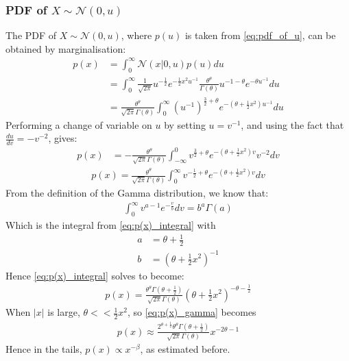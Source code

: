 \documentclass[a4paper]{article}
\begin{document}
\subsubsection{PDF of $X \sim \mathcal{N}(0, u)$}
The PDF of $X \sim \mathcal{N}(0, u)$, where $p(u)$ is taken from \autoref{eq:pdf_of_u}, can be obtained by
marginalisation:
\begin{align*}
    p(x) &= \int_0^\infty \mathcal{N}(x | 0, u) p(u) du \\
    &= \int_0^\infty \frac{1}{\sqrt{2\pi}} u^{-\frac{1}{2}} e^{-\frac{1}{2} x^2 u^{-1}}
    \frac{\theta^{\theta}}{\Gamma(\theta)} u^{-1-\theta} e^{-\theta u^{-1}} du \\
    &= \frac{\theta^{\theta}}{\sqrt{2\pi} \Gamma(\theta)}
    \int_0^\infty \left( u^{-1} \right) ^ {\frac{3}{2} + \theta} e^{-\left( \theta + \frac{1}{2} x^2 \right) u^{-1}} du
\end{align*}
Performing a change of variable on $u$ by setting $u = v^{-1}$, and using the fact that $\frac{du}{dv} = -v^{-2}$,
gives:
\begin{align*}
    p(x) &= - \frac{\theta^{\theta}}{\sqrt{2\pi} \Gamma(\theta)}
    \int_{-\infty}^0 v ^ {\frac{3}{2} + \theta} e^{-\left( \theta + \frac{1}{2} x^2 \right) v} v^{-2} dv
\end{align*}
\begin{align}\label{eq:p(x)_integral}
    p(x) = \frac{\theta^{\theta}}{\sqrt{2\pi} \Gamma(\theta)}
    \int_0^\infty v ^ {-\frac{1}{2} + \theta} e^{-\left( \theta + \frac{1}{2} x^2 \right) v} dv
\end{align}
From the definition of the Gamma distribution, we know that:
\begin{align*}
    \int_0^\infty v ^ {a - 1} e^{-\frac{v}{b}} dv = b^a \Gamma(a)
\end{align*}
Which is the integral from \autoref{eq:p(x)_integral} with
\begin{align*}
    a &= \theta + \frac{1}{2} \\
    b &= \left(\theta + \frac{1}{2} x^2 \right) ^ {-1}
\end{align*}
Hence \autoref{eq:p(x)_integral} solves to become:
\begin{align}\label{eq:p(x)_gamma}
    p(x) = \frac{\theta^{\theta} \Gamma\left(\theta + \frac{1}{2} \right)}{\sqrt{2\pi} \Gamma(\theta)}
    \left( \theta + \frac{1}{2}x^2 \right)^{-\theta - \frac{1}{2}}
\end{align}
When $|x|$ is large, $\theta << \frac{1}{2} x^2$, so \autoref{eq:p(x)_gamma} becomes
\begin{align}
    p(x) \approx \frac{2^{\theta + \frac{1}{2}} \theta^{\theta} \Gamma\left(\theta + \frac{1}{2} \right)}{\sqrt{2\pi} \Gamma(\theta)}
    x ^{-2\theta - 1}
\end{align}
Hence in the tails, $p(x) \propto x^{-\beta}$, as estimated before.
\end{document}
